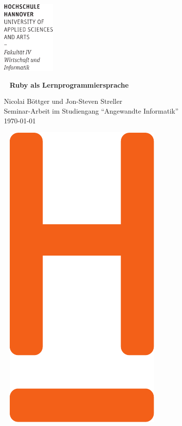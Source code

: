 \documentclass[12pt,DIV=14, version=first, BCOR=10mm,a4paper,twoside,parskip=half-,headsepline,headinclude]{scrartcl}
\begin{document}
  \thispagestyle{empty} %
\includegraphics[width=0.2\textwidth]{Wortmarke_WI_schwarz}

   {  ~ \sffamily
  \vfill
  {\Huge\bfseries Ruby als Lernprogrammiersprache}
  \bigskip

  {\Large
  Nicolai Böttger und Jon-Steven Streller \\[2ex]
 Seminar-Arbeit im Studiengang "`Angewandte Informatik"'
 \\[5ex]
   \today }
}
 \vfill

  ~ \hfill
  \includegraphics[height=0.3\paperheight]{H_WI_Pantone1665}

\vspace*{-3cm}
\end{document}
